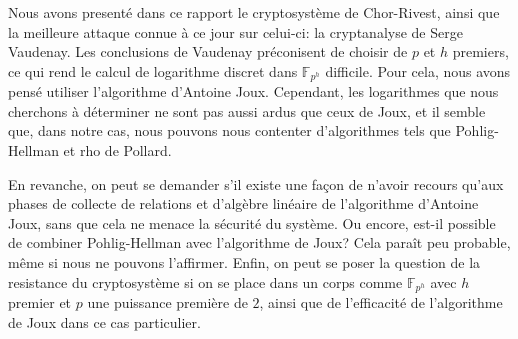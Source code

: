 \documentclass[a4paper, titlepage, 11pt]{article}
\theoremstyle{definition}
\theoremstyle{remark}
\def\gf #1{\mathbb{F}_{#1}}
\begin{document}
Nous avons presenté dans ce rapport le cryptosystème de Chor-Rivest, ainsi que la meilleure
attaque connue à ce jour sur celui-ci: la cryptanalyse de Serge Vaudenay.
Les conclusions de Vaudenay préconisent de choisir de $p$ et $h$ premiers, ce qui rend le calcul de logarithme
discret dans $\gf{p^h}$ difficile. Pour cela, nous avons pensé utiliser l'algorithme d'Antoine Joux.
Cependant, les logarithmes que nous cherchons à déterminer ne sont pas aussi ardus que ceux de Joux, et il semble que, dans notre cas, nous pouvons nous contenter
d'algorithmes tels que Pohlig-Hellman et rho de Pollard.

En revanche, on peut se demander s'il existe une façon de n'avoir recours qu'aux phases de collecte de relations et d'algèbre linéaire de l'algorithme d'Antoine Joux,
sans que cela ne menace la sécurité du système. Ou encore, est-il possible de combiner Pohlig-Hellman avec l'algorithme de Joux? Cela paraît peu probable, même si nous ne pouvons l'affirmer.
Enfin, on peut se poser la question de la resistance du cryptosystème si on se place dans un corps comme $\gf{p^h}$ avec $h$ premier et $p$ une puissance première de $2$, ainsi que
de l'efficacité de l'algorithme de Joux dans ce cas particulier.

\newpage
\thispagestyle{empty}


\end{document}
